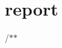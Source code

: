 \chapter{report}
\hypertarget{md_report}{}\label{md_report}
/\texorpdfstring{$\ast$}{*}\texorpdfstring{$\ast$}{*}
\begin{DoxyItemize}
\item 
\end{DoxyItemize}